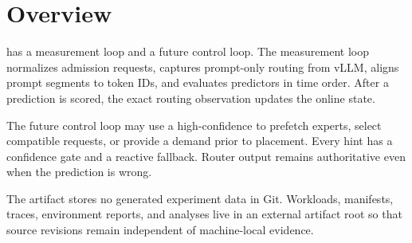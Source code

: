 \section{Overview}

\project has a measurement loop and a future control loop. The measurement loop
normalizes admission requests, captures prompt-only routing from vLLM, aligns
prompt segments to token IDs, and evaluates predictors in time order. After a
prediction is scored, the exact routing observation updates the online state.

The future control loop may use a high-confidence \EWS to prefetch experts,
select compatible requests, or provide a demand prior to placement. Every hint
has a confidence gate and a reactive fallback. Router output remains
authoritative even when the prediction is wrong.

The artifact stores no generated experiment data in Git. Workloads, manifests,
traces, environment reports, and analyses live in an external artifact root so
that source revisions remain independent of machine-local evidence.
